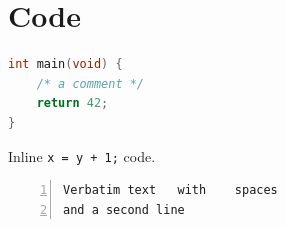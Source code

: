 \documentclass{article}
\begin{document}
\section{Code}
\begin{lstlisting}[language=C]
int main(void) {
    /* a comment */
    return 42;
}
\end{lstlisting}
Inline \lstinline|x = y + 1;| code.
\begin{Verbatim}[frame=single,numbers=left]
Verbatim text   with    spaces
and a second line
\end{Verbatim}
\end{document}
